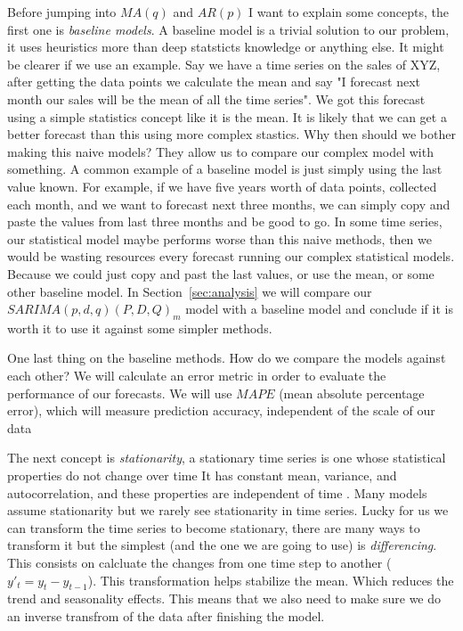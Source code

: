 \documentclass[journal]{IEEEtran}
\begin{document}
Before jumping into $MA(q)$ and $AR(p)$ I want to explain some concepts, the
first one is \emph{baseline models}. A baseline model is a trivial solution
to our problem, it uses heuristics more than deep statsticts knowledge or
anything else. It might be clearer if we use an example. Say we have a time
series on the sales of XYZ, after getting the data points we calculate the
mean and say "I forecast next month our sales will be the mean of all the time
series". We got this forecast using a simple statistics concept like it is the
mean. It is likely that  we can get a better forecast than this using more
complex stastics. Why then should we bother making this naive models? They
allow us to compare our complex model with something. A common example of a
baseline model is just simply using the last value known. For example, if we
have five years worth of data points, collected each month, and we want to
forecast next three months, we can simply copy and paste the values from last
three months and be good to go. In some time series, our statistical model
maybe performs worse than this naive methods, then we would be wasting
resources every forecast running our complex statistical models. Because we
could just copy and past the last values, or use the mean, or some other
baseline model. In Section~\ref {sec:analysis} we will compare our
$SARIMA(p,d,q)(P,D,Q)_m$ model with a baseline model and conclude if it is
worth it to use it against some simpler methods.

One last thing on the baseline methods. How do we compare the models against
each other? We will calculate an error metric in order to evaluate the
performance of our forecasts. We will use $MAPE$ (mean absolute percentage
error), which will measure prediction accuracy, independent of the scale of
our data

The next concept is \emph{stationarity}, a stationary time series is one whose
statistical properties do not change over time It has constant mean, variance,
and autocorrelation, and these properties are independent of time
\cite{timeseries}. Many models assume stationarity but we rarely see
stationarity in time series. Lucky for us we can transform the time series to
become stationary, there are many ways to transform it but the simplest (and
the one we are going to use) is \emph{differencing}. This consists on
calcluate the changes from one time step to another ($y'_t = y_t - y_{t-1}$). This transformation helps
stabilize the mean. Which reduces the trend and seasonality effects. This
means that we also need to make sure we do an inverse transfrom of the data
after finishing the model.
\end{document}

